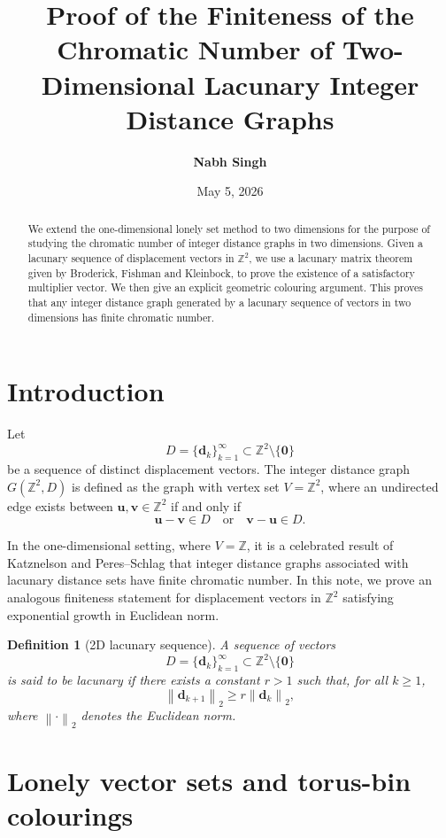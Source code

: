 \documentclass[11pt,fleqn]{article}
\title{\textbf{Proof of the Finiteness of the Chromatic Number of Two-Dimensional Lacunary Integer Distance Graphs}}
\author{\textbf{Nabh Singh}}
\date{May 5, 2026}
\newtheorem{definition}{Definition}
\newcommand{\Z}{\mathbb{Z}}
\newcommand{\norm}[1]{\left\|#1\right\|}
\begin{document}
\maketitle

\begin{abstract}
We extend the one-dimensional lonely set method to two dimensions for the purpose of studying the chromatic number of integer distance graphs in two dimensions. Given a lacunary sequence of displacement vectors in $\Z^2$, we use a lacunary matrix theorem given by Broderick, Fishman and Kleinbock, to prove the existence of a satisfactory multiplier vector. We then give an explicit geometric colouring argument. This proves that any integer distance graph generated by a lacunary sequence of vectors in two dimensions has finite chromatic number.
\end{abstract}

\section{Introduction}

Let
\[
D=\{\mathbf d_k\}_{k=1}^{\infty}\subset \Z^2\setminus\{\mathbf 0\}
\]
be a sequence of distinct displacement vectors. The integer distance graph $G(\Z^2,D)$ is defined as the graph with vertex set $V=\Z^2$, where an undirected edge exists between $\mathbf u,\mathbf v\in \Z^2$ if and only if
\[
\mathbf u-\mathbf v\in D
\quad\text{or}\quad
\mathbf v-\mathbf u\in D.
\]

In the one-dimensional setting, where $V=\Z$, it is a celebrated result of Katznelson \cite{katznelson} and Peres--Schlag \cite{peresschlag} that integer distance graphs associated with lacunary distance sets have finite chromatic number. In this note, we prove an analogous finiteness statement for displacement vectors in $\Z^2$ satisfying exponential growth in Euclidean norm.

\begin{definition}[2D lacunary sequence]
A sequence of vectors
\[
D=\{\mathbf d_k\}_{k=1}^{\infty}\subset \Z^2\setminus\{\mathbf 0\}
\]
is said to be lacunary if there exists a constant $r>1$ such that, for all $k\ge 1$,
\begin{equation}
    \norm{\mathbf d_{k+1}}_2 \ge r\norm{\mathbf d_k}_2,
\end{equation}
where $\norm{\cdot}_2$ denotes the Euclidean norm.
\end{definition}

\section{Lonely vector sets and torus-bin colourings}
\end{document}
